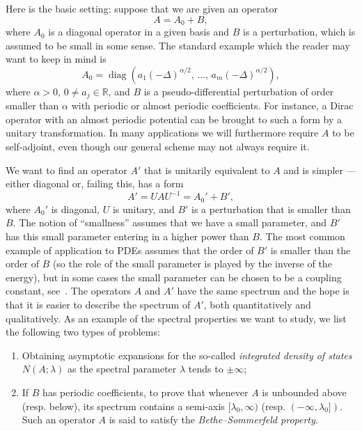 \documentclass[10pt]{amsart}
\theoremstyle{definition}\newtheorem{defi}[theo]{Definition}\newtheorem{rema}[theo]{Remark}\newtheorem{exam}[theo]{Example}\newtheorem{nota}[theo]{Notation}
\DeclareMathOperator{\diag}{diag}
\newcommand{\R}{\mathbb R}
\begin{document}
Here is the basic setting: suppose that we are given an operator
\begin{equation}\label{LP1}
A = A_0 + B,
\end{equation}
where $A_0$ is a diagonal operator in a given basis and $B$ is a perturbation, which is assumed to be small in some sense. The standard example which the reader may want to keep in mind is
\begin{equation}
A_0 = \diag\left(a_1(-\Delta)^{\alpha/2},\,\dotsc,\,a_m(-\Delta)^{\alpha/2}\right),
\end{equation}
where $\alpha>0$, $0 \ne a_j \in \R$, and $B$ is a pseudo-differential perturbation of order smaller than $\alpha$ with periodic or almost periodic coefficients. For instance, a Dirac operator with an almost periodic potential can be brought to such a form by a unitary transformation. In many applications we will furthermore require $A$ to be self-adjoint, even though our general scheme may not always require it.

We want to find an operator $A'$ that is unitarily equivalent to $A$ and is simpler --- either diagonal or, failing this, has a form
\begin{equation}\label{LP2}
A' = U A U^{-1} = A_0' + B',
\end{equation}
where $A_0'$ is diagonal, $U$ is unitary, and $B'$ is a perturbation that is smaller than $B$. The notion of ``smallness'' assumes that we have a small parameter, and $B'$ has this small parameter entering in a higher power than $B$. The most common example of application to PDEs assumes that the order of $B'$ is smaller than the order of $B$ (so the role of the small parameter is played by the inverse of the energy), but in some cases the small parameter can be chosen to be a coupling constant, see~\cite{ParSht2019}. The operators $A$ and $A'$ have the same spectrum and the hope is that it is easier to describe the spectrum of $A'$, both quantitatively and qualitatively. As an example of the spectral properties we want to study, we list the following two types of problems:
\begin{enumerate}
\item Obtaining asymptotic expansions for the so-called \emph{integrated density of states} $N(A;\lambda)$ as the spectral parameter $\lambda$ tends to $\pm \infty$;
\item If $B$ has periodic coefficients, to prove that whenever $A$ is unbounded above (resp. below), its spectrum contains a semi-axis $[\lambda_0,\infty)$ (resp. $(-\infty,\lambda_0])$. Such an operator $A$ is said to satisfy the
\emph{Bethe--Sommerfeld property}.
\end{enumerate}
\end{document}
